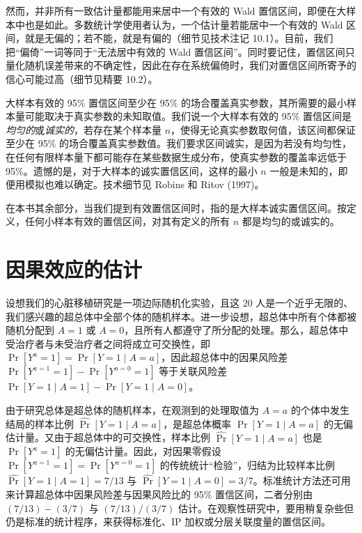 然而，并非所有一致估计量都能用来居中一个有效的 Wald 置信区间，即便在大样本中也是如此。多数统计学使用者认为，一个估计量若能居中一个有效的 Wald 区间，就是无偏的；若不能，就是有偏的（细节见技术注记 10.1）。目前，我们把“偏倚”一词等同于“无法居中有效的 Wald 置信区间”。同时要记住，置信区间只量化随机误差带来的不确定性，因此在存在系统偏倚时，我们对置信区间所寄予的信心可能过高（细节见精要 10.2）。

\begin{finepoint}[诚实的置信区间]
大样本有效的 95\% 置信区间至少在 95\% 的场合覆盖真实参数，其所需要的最小样本量可能取决于真实参数的未知取值。我们说一个大样本有效的 95\% 置信区间是\emph{均匀的}或\emph{诚实的}，若存在某个样本量 $n$，使得无论真实参数取何值，该区间都保证至少在 95\% 的场合覆盖真实参数值。我们要求区间诚实，是因为若没有均匀性，在任何有限样本量下都可能存在某些数据生成分布，使真实参数的覆盖率远低于 95\%。遗憾的是，对于大样本的诚实置信区间，这样的最小 $n$ 一般是未知的，即便用模拟也难以确定。技术细节见 Robins 和 Ritov (1997)。

在本书其余部分，当我们提到有效置信区间时，指的是大样本诚实置信区间。按定义，任何小样本有效的置信区间，对其有定义的所有 $n$ 都是均匀的或诚实的。
\end{finepoint}

\section{因果效应的估计}

设想我们的心脏移植研究是一项边际随机化实验，且这 20 人是一个近乎无限的、我们感兴趣的超总体中全部个体的随机样本。进一步设想，超总体中所有个体都被随机分配到 $A=1$ 或 $A=0$，且所有人都遵守了所分配的处理。那么，超总体中受治疗者与未受治疗者之间将成立可交换性，即 $\Pr[Y^a=1]=\Pr[Y=1\mid A=a]$，因此超总体中的因果风险差 $\Pr[Y^{a=1}=1]-\Pr[Y^{a=0}=1]$ 等于关联风险差 $\Pr[Y=1\mid A=1]-\Pr[Y=1\mid A=0]$。

由于研究总体是超总体的随机样本，在观测到的处理取值为 $A=a$ 的个体中发生结局的样本比例 $\widehat{\Pr}[Y=1\mid A=a]$，是超总体概率 $\Pr[Y=1\mid A=a]$ 的无偏估计量。又由于超总体中的可交换性，样本比例 $\widehat{\Pr}[Y=1\mid A=a]$ 也是 $\Pr[Y^a=1]$ 的无偏估计量。因此，对因果零假设 $\Pr[Y^{a=1}=1]=\Pr[Y^{a=0}=1]$ 的传统统计“检验”，归结为比较样本比例 $\widehat{\Pr}[Y=1\mid A=1]=7/13$ 与 $\widehat{\Pr}[Y=1\mid A=0]=3/7$。标准统计方法还可用来计算超总体中因果风险差与因果风险比的 95\% 置信区间，二者分别由 $(7/13)-(3/7)$ 与 $(7/13)/(3/7)$ 估计。在观察性研究中，要用稍复杂些但仍是标准的统计程序，来获得标准化、IP 加权或分层关联度量的置信区间。

